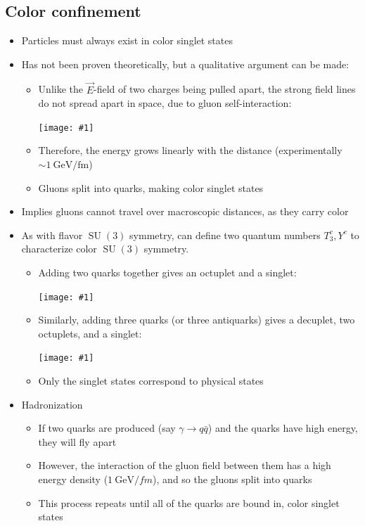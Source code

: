 \documentclass[11pt]{article}
\newcommand{\qbar}{{\bar{q}}}
\newcommand{\E}{\ensuremath{\vec{E}}}
\DeclareMathOperator{\SU}{SU}
\newcommand{\gev}{\text{GeV}}
\newcommand{\fm}{\text{fm}}
\newcommand{\embedimgw}[2]{\begin{center}\texttt{[image: \#1]}\end{center}}
\begin{document}
\subsection{Color confinement}
\begin{itemize}
  \item Particles must always exist in color singlet states 
  \item Has not been proven theoretically, but a qualitative argument can be made:
  \begin{itemize}
    \item Unlike the $\E$-field of two charges being pulled apart, the strong field lines do not spread apart in space, due to gluon self-interaction:
    \embedimgw{figs/qcdfieldlines.png}{.6}
    \item Therefore, the energy grows linearly with the distance (experimentally $\sim 1~\gev/\fm$)
    \item Gluons split into quarks, making color singlet states
  \end{itemize}
  \item Implies gluons cannot travel over macroscopic distances, as they carry color
  \item As with flavor $\SU(3)$ symmetry, can define two quantum numbers $T_3^c,Y^c$ to characterize color $\SU(3)$ symmetry.
  \begin{itemize}
    \item Adding two quarks together gives an octuplet and a singlet:
    \embedimgw{figs/mesoncolor.png}{0.6}
    \item Similarly, adding three quarks (or three antiquarks) gives a decuplet, two octuplets, and a singlet:
    \embedimgw{figs/baryoncolor.png}{0.6}
    \item Only the singlet states correspond to physical states
  \end{itemize}
  \item Hadronization
  \begin{itemize}
    \item If two quarks are produced (say $\gamma\rightarrow q\qbar$) and the quarks have high energy, they will fly apart
    \item However, the interaction of the gluon field between them has a high energy density ($1~\gev/fm$), and so the gluons split into quarks
    \item This process repeats until all of the quarks are bound in, color singlet states
  \end{itemize}
\end{itemize}
\end{document}
